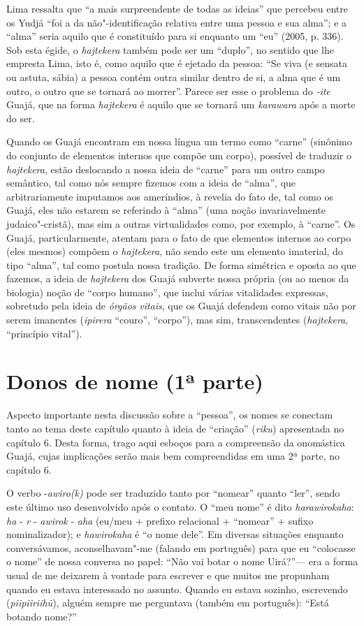 Lima ressalta que ``a mais surpreendente de todas as ideias'' que percebeu
entre os Yudjá ``foi a da não"-identificação relativa entre uma pessoa e
sua alma''; e a ``alma'' seria aquilo que é constituído para si enquanto um
``eu'' (2005, p. 336). Sob esta égide, o \emph{hajtekera} também pode ser
um ``duplo'', no sentido que lhe empresta Lima, isto é, como aquilo que é
ejetado da pessoa: ``Se viva (e sensata ou astuta, sábia) a pessoa contém
outra similar dentro de si, a alma que é um outro, o outro que se
tornará ao morrer''. Parece ser esse o problema do \emph{-ite} Guajá, que
na forma \emph{hajtekera} é aquilo que se tornará um \emph{karawara}
após a morte do ser.

Quando os Guajá encontram em nossa língua um termo como ``carne''
(sinônimo do conjunto de elementos internos que compõe um corpo),
possível de traduzir o \emph{hajtekera}, estão deslocando a nossa ideia
de ``carne'' para um outro campo semântico, tal como nós sempre fizemos
com a ideia de ``alma'', que arbitrariamente imputamos aos ameríndios, à
revelia do fato de, tal como os Guajá, eles não estarem se referindo à
``alma'' (uma noção invariavelmente judaico"-cristã), mas sim a outras
virtualidades como, por exemplo, à ``carne''. Os Guajá, particularmente,
atentam para o fato de que elementos internos ao corpo (eles mesmos)
compõem o \emph{hajtekera}, não sendo este um elemento imaterial, do
tipo ``alma'', tal como postula nossa tradição. De forma simétrica e
oposta ao que fazemos, a ideia de \emph{hajtekera} dos Guajá subverte
nossa própria (ou ao menos da biologia) noção de ``corpo humano'', que
inclui várias vitalidades expressas, sobretudo pela ideia de
\emph{órgãos} \emph{vitais}, que os Guajá defendem como vitais não por
serem imanentes (\emph{ipirera} ``couro'', ``corpo''), mas sim,
transcendentes (\emph{hajtekera}, ``princípio vital'').

\section{Donos de nome (1ª parte)}

Aspecto importante nesta discussão sobre a ``pessoa'', os nomes se
conectam tanto ao tema deste capítulo quanto à ideia de ``criação''
(\emph{riku}) apresentada no capítulo 6. Desta forma, trago aqui esboços
para a compreensão da onomástica Guajá, cujas implicações serão mais bem
compreendidas em uma 2ª parte, no capítulo 6.

O verbo -\emph{awiro(k)} pode ser traduzido tanto por ``nomear'' quanto
``ler'', sendo este último uso desenvolvido após o contato. O ``meu
nome'' é dito \emph{harawirokaha}: \emph{ha} - \emph{r} - \emph{awirok}
- \emph{aha} (eu/meu + prefixo relacional + ``nomear'' + sufixo
nominalizador); e \emph{hawirokaha} é ``o nome dele''. Em diversas
situações enquanto conversávamos, aconselhavam"-me (falando em português)
para que eu ``colocasse o nome'' de nossa conversa no papel: ``Não vai
botar o nome Uirá?''--- era a forma usual de me deixarem à vontade para
escrever e que muitos me propunham quando eu estava interessado no
assunto. Quando eu estava sozinho, escrevendo (\emph{piipiiriihũ}),
alguém sempre me perguntava (também em português): ``Está botando
nome?''

